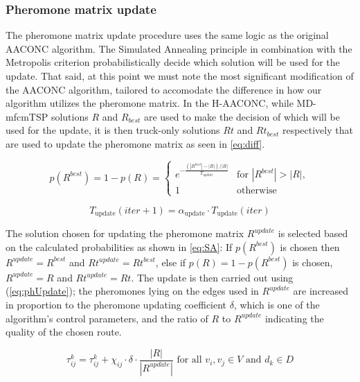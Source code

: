 \documentclass{article}
\begin{document}
	\subsubsection{Pheromone matrix update}
	The pheromone matrix update procedure uses the same logic as the original AACONC algorithm. The Simulated Annealing principle in combination with the Metropolis criterion probabilistically decide which solution will be used for the update. That said, at this point we must note the most significant modification of the AACONC algorithm, tailored to accomodate the difference in how our algorithm utilizes the pheromone matrix. In the H-AACONC, while MD-mfcmTSP solutions $R$ and $R_{best}$ are used to make the decision of which will be used for the update, it is then truck-only solutions $Rt$ and $Rt_{best}$ respectively that are used to update the pheromone matrix as seen in \autoref{eq:diff}.
	
	\begin{equation}
		p(R^{best}) = 1 - p(R) = 
		\begin{cases}
			e^{-\frac{(|R^{best}| - |R|)/|R|}{T_{update}}} & \text{for } |R^{best}| > |R|, \\
			1 & \text{otherwise}
		\end{cases}
		\label{eq:SA}
	\end{equation}
	
	\begin{equation}
		T_{\text{update}}(iter + 1) = \alpha_{\text{update}} \cdot T_{\text{update}}(iter)
		\label{eq:Tupdate}
	\end{equation}
	
	The solution chosen for updating the pheromone matrix $R^{update}$ is selected based on the calculated probabilities as shown in \autoref{eq:SA}: If $p(R^{best})$ is chosen then $R^{update} = R^{best}$ and $Rt^{update} = Rt^{best}$, else if $p(R) = 1 - p(R^{best})$ is chosen, $R^{update} = R$ and $Rt^{update} = Rt$. The update is then carried out using (\autoref{eq:phUpdate}); the pheromones lying on the edges used in $R^{update}$ are increased in proportion to the pheromone updating coefficient $\delta$, which is one of the algorithm's control parameters, and the ratio of $R$ to $R^{update}$ indicating the quality of the chosen route.
	
	\begin{equation}
		\tau_{ij}^k = \tau_{ij}^k + \chi_{ij}\cdot \delta \cdot \frac{|R|}{|R^{update}|} \text{ for all } v_i,v_j \in V \text{ and } d_k\in D
		\label{eq:phUpdate}
	\end{equation}
	
\end{document}
